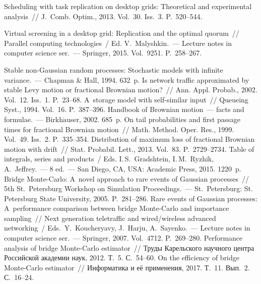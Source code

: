 \begin{multicols}{2}
{{\begin{thebibliography}{99}
 Scheduling with task replication on desktop grids: Theoretical and experimental 
 analysis~// J.~Comb. Optim., 2013.  Vol.~30. Iss.~3. P.~520--544.
 
 Virtual screening in a desktop grid: Replication and the optimal quorum~// 
  Parallel computing technologies~/ Ed. V.~Malyshkin.~---
 Lecture notes in computer science ser.~---  Springer, 2015.  
 Vol.~9251. P.~258--267.
 
 Stable non-Gaussian random processes: Stochastic 
models with infinite variance.~--- Chapman \& Hall, 1994. 632~p.
Is network traffic approximated by stable Levy motion or fractional Brownian motion?~// 
Ann. Appl. Probab., 2002. Vol.~12. Iss.~1. P.~23--68.
 A~storage model with self-similar input~// Queueing Syst., 1994. 
Vol.~16. P.~387--396.
 Handbook of Brownian motion~--- facts and formulae.~--- Birkh$\ddot{\mbox{a}}$user, 2002. 685~p.
 On tail probabilities and first passage times for fractional 
Brownian motion~// Math. Method. Oper. Res., 1999. Vol.~49. Iss.~2. 
P.~335--354.
 Distribution of maximum loss of fractional 
Brownian motion with drift~// Stat. Probabil. Lett., 2013. Vol.~83. P.~2729--2734.
Table of integrals, series and products~/
Eds.  I.\,S.~Gradshtein, I.\,M.~Ryzhik, A.~Jeffrey.~--- 8 ed.~---
San Diego, CA, USA: Academic Press, 2015. 1220~p.
 Bridge Monte-Carlo: 
A~novel approach to rare events of Gaussian processes~// 5th St.\ 
Petersburg Workshop on Simulation Proceedings.~--- St.\ Petersburg: St. Petersburg 
State University, 2005. P.~281--286.
 Rare events of Gaussian processes: 
A~performance comparison between bridge Monte-Carlo and importance sampling~// 
Next generation teletraffic and wired/wireless advanced networking~/
 Eds.\ Y.~Koucheryavy, J.~Harju, A.~Sayenko.~--- 
 Lecture notes in computer science ser.~--- Springer, 2007.
Vol.~4712. P.~269--280.
Performance analysis of bridge Monte-Carlo estimator~// 
Труды Карельского научного центра Российской академии наук, 
2012. Т.~5. С.~54--60.
 On the efficiency of bridge Monte-Carlo estimator~// Информатика и её применения,
  2017.  Т.~11. Вып.~2. С.~16--24.


\end{thebibliography}}}
\end{multicols}
